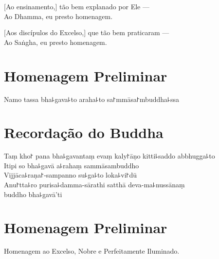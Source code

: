 [Ao ensinamento,] tão bem explanado por Ele ---\\
 Ao Dhamma, eu presto homenagem. 

[Aos discípulos do Excelso,] que tão bem praticaram ---\\
Ao Saṅgha, eu presto homenagem. 

\clearpage

\chapter*{Homenagem Preliminar}

\begin{leader}
\end{leader}

Namo tassa bha꜕gava꜕to araha꜕to sa꜓mmāsa꜓mbuddha꜕ssa


\chapter*{Recordação do Buddha}

\delegateSetUseNext

\begin{leader}
\end{leader}

Taṃ kho꜓ pana bha꜕gavantaṃ evaṃ kaly꜓āṇo kitti꜕saddo abbhugga꜕to\\
Itipi so bha꜕gavā a꜕rahaṃ sammāsambuddho\\
Vijjāca꜕raṇa꜓-sampanno su꜕ga꜕to loka꜕vi꜓dū\\
Anu꜓tta꜕ro purisa꜕damma-sārathi satthā deva-ma꜕nussānaṃ\\
\vin buddho bha꜕gavā'ti

\clearpage

\chapter{Homenagem Preliminar}

\begin{leader}
\end{leader}

Homenagem ao Excelso, Nobre e Perfeitamente Iluminado.


\nextChapterUseDelegatedPageNumber

